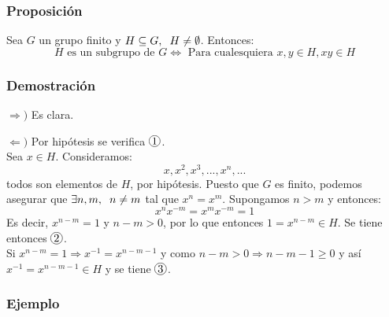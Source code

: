 \documentclass[11pt,a4paper]{article}
\newcommand*{\circled}[2][]{\tikz[baseline=(C.base)]{
	\node[inner sep=0pt] (C) {\vphantom{1g}#2};
	\node[draw, circle, inner sep=1pt, yshift=1pt]
		at (C.center) {\vphantom{1g}};}}
\begin{document}
\subsubsection*{Proposición}

Sea $G$ un grupo finito y $H \subseteq G, \hspace{0.2cm} H \neq \emptyset$. Entonces:
$$H \text{ es un subgrupo de } G \iff \text{ Para cualesquiera } x,y \in H, xy \in H$$

\subsubsection*{Demostración}

\begin{enumerate*}
\item[$\Rightarrow)$] Es clara.
\item[$\Leftarrow)$] Por hipótesis se verifica $\circled{1}$. \\
Sea $x \in H$. Consideramos:
$$x, x^{2}, x^{3}, ..., x^{n}, ...$$
todos son elementos de $H$, por hipótesis. Puesto que $G$ es finito, podemos asegurar que $\exists n,m, \hspace{0.2cm} n \neq m$ tal que $x^{n} = x^{m}$. Supongamos $n > m$ y entonces:
$$x^{n}x^{-m} = x^{m}x^{-m} = 1$$
Es decir, $x^{n-m} = 1$ y $n-m > 0$, por lo que entonces $1 = x^{n-m} \in H$. Se tiene entonces $\circled{2}$. \\
Si $x^{n-m} = 1 \Rightarrow x^{-1} = x^{n-m-1}$ y como $n-m > 0 \Rightarrow n-m-1 \geq 0$ y así $x^{-1} = x^{n-m-1} \in H$ y se tiene $\circled{3}$.
\end{enumerate*}
 
\subsubsection*{Ejemplo}
\end{document}
